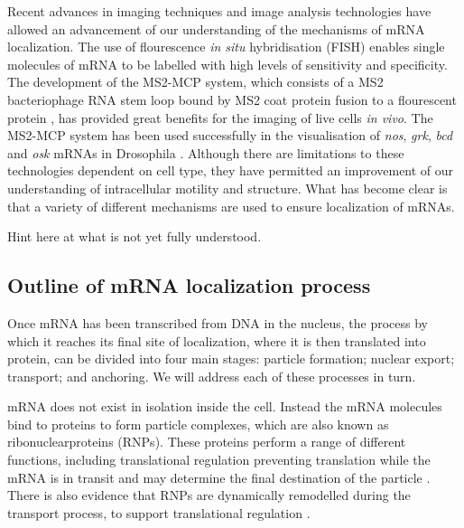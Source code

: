 \documentclass[twocolumn]{biophys}
\begin{document}
Recent advances in imaging techniques and image analysis technologies \citep{jeffery1983localization, bertrand1998localization, hamilton2010particlestats} have allowed an advancement of our understanding of the mechanisms of mRNA localization. 
The use of flourescence \textit{in situ} hybridisation (FISH) enables single molecules of mRNA to be labelled with high levels of sensitivity and specificity. 
The development of the MS2-MCP system, which consists of a MS2 bacteriophage RNA stem loop bound by MS2 coat protein fusion to a flourescent protein \citep{parton2014subcellular}, has provided great benefits for the imaging of live cells \textit{in vivo}.
The MS2-MCP system has been used successfully in the visualisation of \textit{nos}, \textit{grk}, \textit{bcd} and \textit{osk} mRNAs in Drosophila \citep{forrest2003live, jaramillo2008dynamics, weil2006localization, zimyanin2008vivo}.
Although there are limitations to these technologies dependent on cell type, they have permitted an improvement of our understanding of intracellular motility and structure.
What has become clear is that a variety of different mechanisms are used to ensure localization of mRNAs.

Hint here at what is not yet fully understood.

\subsection{Outline of mRNA localization process}

Once mRNA has been transcribed from DNA in the nucleus, the process by which it reaches its final site of localization, where it is then translated into protein, can be divided into four main stages: particle formation; nuclear export; transport; and anchoring.
We will address each of these processes in turn.

mRNA does not exist in isolation inside the cell.
Instead the mRNA molecules bind to proteins to form particle complexes, which are also known as ribonuclearproteins (RNPs). 
These proteins perform a range of different functions, including translational regulation preventing translation while the mRNA is in transit and may determine the final destination of the particle \citep{hamilton2013multidisciplinary}.
There is also evidence that RNPs are dynamically remodelled during the transport process, to support translational regulation \citep{weil2012drosophila}.
\end{document}
